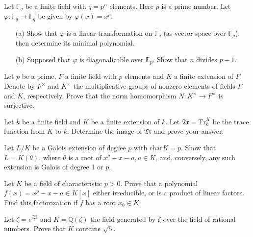 \begin{prob}[F2010-Q5]
    Let \(\mathbb{F}_q\) be a finite field with \(q = p^n\) elements. Here \(p\) is a prime number. Let \(\varphi : \mathbb{F}_q \rightarrow \mathbb{F}_q\) be given by \(\varphi(x) = x^p\).
    \begin{itemize}
        \item[(a)] Show that \(\varphi\) is a linear transformation on \(\mathbb{F}_q\) (as vector space over \(\mathbb{F}_p\)), then determine its minimal polynomial.
        \item[(b)] Supposed that \(\varphi\) is diagonalizable over \(\mathbb{F}_p\). Show that \(n\) divides \(p - 1\).
    \end{itemize}
\end{prob}

\begin{prob}[S2011-Q2]
    Let \(p\) be a prime, \(F\) a finite field with \(p\) elements and \(K\) a finite extension of \(F\). Denote by \(F^\times\) and \(K^\times\) the multiplicative groups of nonzero elements of fields \(F\) and \(K\), respectively. Prove that the norm homomorphism \(N:K^\times\to F^\times\) is surjective.
\end{prob}


\begin{prob}[F2008-Q3]
    Let \(k\) be a finite field and \(K\) be a finite extension of \(k\). Let \(\mathfrak{Tr} = \text{Tr}_k^K\) be the trace function from \(K\) to \(k\). Determine the image of \(\mathfrak{Tr}\) and prove your answer.
\end{prob}


\begin{prob}[S2014-Q3]
    Let \(L/K\) be a Galois extension of degree \(p\) with \(\text{char}K=p\). Show that \(L=K(\theta)\), where \(\theta\) is a root of \(x^{p}-x-a,a\in K\), and, conversely, any such extension is Galois of degree 1 or \(p\).
\end{prob}


\begin{prob}[S2015-Q1]
    Let \(K\) be a field of characteristic \(p>0\). Prove that a polynomial \(f(x)=x^{p}-x-a\in K[x]\) either irreducible, or is a product of linear factors. Find this factorization if \(f\) has a root \(x_{0}\in K\).
\end{prob}


\begin{prob}[S2002-Q5]
    Let \(\zeta = e^{\frac{2\pi i}{5}}\) and \(K = \mathbb{Q}(\zeta)\) the field generated by \(\zeta\) over the field of rational numbers. Prove that \(K\) contains \(\sqrt{5}\).
\end{prob}


